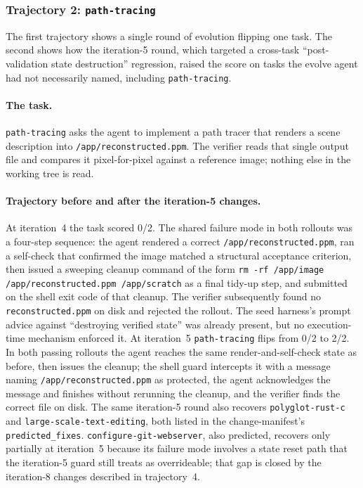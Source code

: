 
\FloatBarrier

\subsubsection{Trajectory 2: \texttt{path-tracing}}
\label{app:case-study:pathtracing}

The first trajectory shows a single round of evolution flipping one task. The second shows how the iteration-5 round, which targeted a cross-task ``post-validation state destruction'' regression, raised the score on tasks the evolve agent had not necessarily named, including \texttt{path-tracing}.

\paragraph{The task.}
\texttt{path-tracing} asks the agent to implement a path tracer that renders a scene description into \texttt{/app/reconstructed.ppm}. The verifier reads that single output file and compares it pixel-for-pixel against a reference image; nothing else in the working tree is read.

\paragraph{Trajectory before and after the iteration-5 changes.}
At iteration~4 the task scored 0/2. The shared failure mode in both rollouts was a four-step sequence: the agent rendered a correct \texttt{/app/reconstructed.ppm}, ran a self-check that confirmed the image matched a structural acceptance criterion, then issued a sweeping cleanup command of the form \texttt{rm -rf /app/image /app/reconstructed.ppm /app/scratch} as a final tidy-up step, and submitted on the shell exit code of that cleanup. The verifier subsequently found no \texttt{reconstructed.ppm} on disk and rejected the rollout. The seed harness's prompt advice against ``destroying verified state'' was already present, but no execution-time mechanism enforced it. At iteration~5 \texttt{path-tracing} flips from 0/2 to 2/2. In both passing rollouts the agent reaches the same render-and-self-check state as before, then issues the cleanup; the shell guard intercepts it with a message naming \texttt{/app/reconstructed.ppm} as protected, the agent acknowledges the message and finishes without rerunning the cleanup, and the verifier finds the correct file on disk. The same iteration-5 round also recovers \texttt{polyglot-rust-c} and \texttt{large-scale-text-editing}, both listed in the change-manifest's \texttt{predicted\_fixes}. \texttt{configure-git-webserver}, also predicted, recovers only partially at iteration~5 because its failure mode involves a state reset path that the iteration-5 guard still treats as overrideable; that gap is closed by the iteration-8 changes described in trajectory~4.


